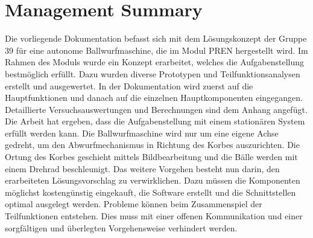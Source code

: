 \section{Management Summary}
Die vorliegende Dokumentation befasst sich mit dem Lösungskonzept der Gruppe 39 für eine autonome Ballwurfmaschine, die im Modul PREN hergestellt wird. 
Im Rahmen des Moduls wurde ein Konzept erarbeitet, welches die Aufgabenstellung bestmöglich erfüllt. Dazu wurden diverse Prototypen und Teilfunktionsanalysen erstellt und ausgewertet. In der Dokumentation wird zuerst auf die Hauptfunktionen und danach auf die einzelnen Hauptkomponenten eingegangen. Detaillierte Versuchsauswertungen und Berechnungen sind dem Anhang angefügt.  
Die Arbeit hat ergeben, dass die Aufgabenstellung mit einem stationären System erfüllt werden kann. Die Ballwurfmaschine wird nur um eine eigene Achse gedreht, um den Abwurfmechanismus in Richtung des Korbes auszurichten. Die Ortung des Korbes geschieht mittels Bildbearbeitung und die Bälle werden mit einem Drehrad beschleunigt. 
Das weitere Vorgehen besteht nun darin, den erarbeiteten Lösungsvorschlag zu verwirklichen. Dazu müssen die Komponenten möglichst kostengünstig eingekauft, die Software erstellt und die Schnittstellen optimal ausgelegt werden. Probleme können beim Zusammenspiel der Teilfunktionen entstehen. Dies muss mit einer offenen Kommunikation und einer sorgfältigen und überlegten Vorgehensweise verhindert werden. 

